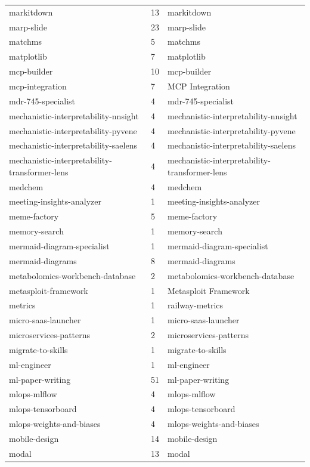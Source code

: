 \begin{longtable}{@{}lll@{}}
markitdown & 13 & markitdown\\
marp-slide & 23 & marp-slide\\
matchms & 5 & matchms\\
matplotlib & 7 & matplotlib\\
mcp-builder & 10 & mcp-builder\\
mcp-integration & 7 & MCP Integration\\
mdr-745-specialist & 4 & mdr-745-specialist\\
mechanistic-interpretability-nnsight & 4 & mechanistic-interpretability-nnsight\\
mechanistic-interpretability-pyvene & 4 & mechanistic-interpretability-pyvene\\
mechanistic-interpretability-saelens & 4 & mechanistic-interpretability-saelens\\
mechanistic-interpretability-transformer-lens & 4 & mechanistic-interpretability-transformer-lens\\
medchem & 4 & medchem\\
meeting-insights-analyzer & 1 & meeting-insights-analyzer\\
meme-factory & 5 & meme-factory\\
memory-search & 1 & memory-search\\
mermaid-diagram-specialist & 1 & mermaid-diagram-specialist\\
mermaid-diagrams & 8 & mermaid-diagrams\\
metabolomics-workbench-database & 2 & metabolomics-workbench-database\\
metasploit-framework & 1 & Metasploit Framework\\
metrics & 1 & railway-metrics\\
micro-saas-launcher & 1 & micro-saas-launcher\\
microservices-patterns & 2 & microservices-patterns\\
migrate-to-skills & 1 & migrate-to-skills\\
ml-engineer & 1 & ml-engineer\\
ml-paper-writing & 51 & ml-paper-writing\\
mlops-mlflow & 4 & mlops-mlflow\\
mlops-tensorboard & 4 & mlops-tensorboard\\
mlops-weights-and-biases & 4 & mlops-weights-and-biases\\
mobile-design & 14 & mobile-design\\
modal & 13 & modal\\

\end{longtable}
